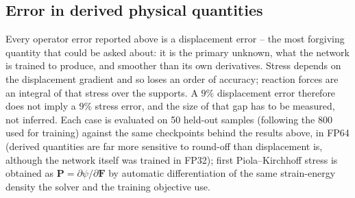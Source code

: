 \documentclass[final,5p,times]{elsarticle}
\begin{document}
\subsection{Error in derived physical quantities}
\label{sec:derived-quantities}
Every operator error reported above is a displacement error -- the most
forgiving quantity that could be asked about: it is the primary unknown,
what the network is trained to produce, and smoother than its own
derivatives. Stress depends on the displacement gradient and so loses an
order of accuracy; reaction forces are an integral of that stress over the
supports. A $9\%$ displacement error therefore does not imply a $9\%$
stress error, and the size of that gap has to be measured, not inferred.
Each case is evaluated on 50 held-out samples (following the 800 used for
training) against the same checkpoints behind the results above, in FP64
(derived quantities are far more sensitive to round-off than displacement
is, although the network itself was trained in FP32); first
Piola--Kirchhoff stress is obtained as $\mathbf{P}=\partial\psi/\partial\mathbf{F}$
by automatic differentiation of the same strain-energy density the solver
and the training objective use.
\end{document}
